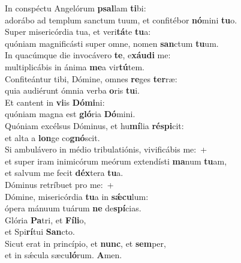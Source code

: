\evenverse In conspéctu Angelórum \textbf{psal}lam \textbf{ti}bi:~\*\\
\evenverse adorábo ad templum sanctum tuum, et confitébor \textbf{nó}mini \textbf{tu}o.\\
\oddverse Super misericórdia tua, et veri\textbf{tá}te \textbf{tu}a:~\*\\
\oddverse quóniam magnificásti super omne, nomen \textbf{san}ctum \textbf{tu}um.\\
\evenverse In quacúmque die invocávero \textbf{te}, e\textbf{xáu}\textbf{di} me:~\*\\
\evenverse multiplicábis in ánima \textbf{me}a vir\textbf{tú}tem.\\
\oddverse Confiteántur tibi, Dómine, omnes \textbf{re}ges \textbf{ter}ræ:~\*\\
\oddverse quia audiérunt ómnia verba \textbf{o}ris \textbf{tu}i.\\
\evenverse Et cantent in \textbf{vi}is \textbf{Dó}\textbf{mi}ni:~\*\\
\evenverse quóniam magna est \textbf{gló}ria \textbf{Dó}mini.\\
\oddverse Quóniam excélsus Dóminus, et hu\textbf{mí}lia \textbf{ré}\textbf{spi}cit:~\*\\
\oddverse et alta a \textbf{lon}ge co\textbf{gnó}scit.\\
\evenverse Si ambulávero in médio tribulatiónis, vivificábis me:~+\\
\evenverse  et super iram inimicórum meórum extendísti \textbf{ma}num \textbf{tu}am,~\*\\
\evenverse et salvum me fecit \textbf{déx}tera \textbf{tu}a.\\
\oddverse Dóminus retríbuet pro me:~+\\
\oddverse  Dómine, misericórdia \textbf{tu}a in \textbf{sǽ}\textbf{cu}lum:~\*\\
\oddverse ópera mánuum tuárum \textbf{ne} de\textbf{spí}cias.\\
\evenverse Glória \textbf{Pa}tri, et \textbf{Fí}\textbf{li}o,~\*\\
\evenverse et Spi\textbf{rí}tui \textbf{San}cto.\\
\oddverse Sicut erat in princípio, et \textbf{nunc}, et \textbf{sem}per,~\*\\
\oddverse et in sǽcula sæcu\textbf{ló}rum. \textbf{A}men.\\
